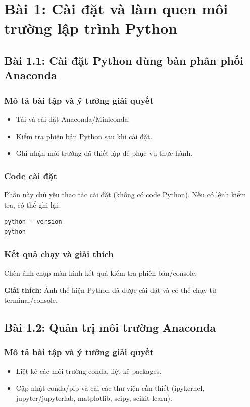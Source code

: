 \chapter{Bài 1: Cài đặt và làm quen môi trường lập trình Python}

\section{Bài 1.1: Cài đặt Python dùng bản phân phối Anaconda}
\subsection{Mô tả bài tập và ý tưởng giải quyết}
\begin{itemize}
  \item Tải và cài đặt Anaconda/Miniconda.
  \item Kiểm tra phiên bản Python sau khi cài đặt.
  \item Ghi nhận môi trường đã thiết lập để phục vụ thực hành.
\end{itemize}

\subsection{Code cài đặt}
Phần này chủ yếu thao tác cài đặt (không có code Python). Nếu có lệnh kiểm tra, có thể ghi lại:

\begin{lstlisting}
python --version
python
\end{lstlisting}

\subsection{Kết quả chạy và giải thích}
Chèn ảnh chụp màn hình kết quả kiểm tra phiên bản/console.


\textbf{Giải thích:} Ảnh thể hiện Python đã được cài đặt và có thể chạy từ terminal/console.

\section{Bài 1.2: Quản trị môi trường Anaconda}
\subsection{Mô tả bài tập và ý tưởng giải quyết}
\begin{itemize}
  \item Liệt kê các môi trường conda, liệt kê packages.
  \item Cập nhật conda/pip và cài các thư viện cần thiết (ipykernel, jupyter/jupyterlab, matplotlib, scipy, scikit-learn).
\end{itemize}

